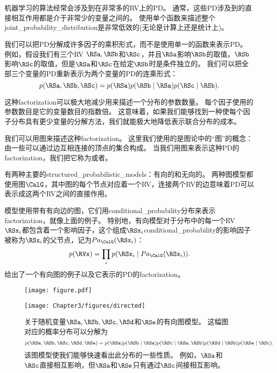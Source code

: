 
\section{}
\label{sec:structured_probabilistic_models_chap3}

机器学习的算法经常会涉及到在非常多的\gls{RV}上的\gls{PD}。
通常，这些\gls{PD}涉及到的直接相互作用都是介于非常少的变量之间的。
使用单个函数来描述整个\gls{joint_probability_distribution}是非常低效的(无论是计算上还是统计上)。

我们可以把\gls{PD}分解成许多因子的乘积形式，而不是使用单一的函数来表示\gls{PD}。
例如，假设我们有三个\gls{RV} $\RSa, \RSb$和$\RSc$，并且$\RSa$影响$\RSb$的取值，$\RSb$影响$\RSc$的取值，但是$\RSa$和$\RSc$在给定$\RSb$时是条件独立的。
我们可以把全部三个变量的\gls{PD}重新表示为两个变量的\gls{PD}的连乘形式：
\begin{equation}
p(\RSa, \RSb, \RSc) = p(\RSa)p(\RSb\mid \RSa)p(\RSc\mid\RSb).
\end{equation}

这种\gls{factorization}可以极大地减少用来描述一个分布的参数数量。
每个因子使用的参数数目是它的变量数目的指数倍。
这意味着，如果我们能够找到一种使每个因子分布具有更少变量的分解方法，我们就能极大地降低表示联合分布的成本。

我们可以用图来描述这种\gls{factorization}。
这里我们使用的是图论中的``图''的概念：由一些可以通过边互相连接的顶点的集合构成。
当我们用图来表示这种\gls{PD}的\gls{factorization}，我们把它称为或者。

有两种主要的\gls{structured_probabilistic_models}：有向的和无向的。
两种图模型都使用图$\CalG$，其中图的每个节点对应着一个\gls{RV}，连接两个\gls{RV}的边意味着\gls{PD}可以表示成这两个\gls{RV}之间的直接作用。

模型使用带有有向边的图，它们用\gls{conditional_probability}分布来表示\gls{factorization}，就像上面的例子。
特别地，有向模型对于分布中的每一个\gls{RV} $\RSx_i$都包含着一个影响因子，这个组成$\RSx_i$\gls{conditional_probability}的影响因子被称为$\RSx_i$的父节点，记为$Pa_\CalG(\RSx_i)$：
\begin{equation}
p(\RVx) = \prod_i p(\RSx_i \mid Pa_\CalG(\RSx_i)).
\end{equation}
给出了一个有向图的例子以及它表示的\gls{PD}的\gls{factorization}。
\begin{figure}[!htb]
\ifOpenSource
\centerline{\texttt{[image: figure.pdf]}}
\else
\centerline{\texttt{[image: Chapter3/figures/directed]}}
\fi
\captionsetup{singlelinecheck=off}
\caption[.]{关于随机变量$\RSa, \RSb, \RSc, \RSd$和$\RSe$的有向图模型。
这幅图对应的概率分布可以分解为
\begin{equation}
p(\RSa, \RSb, \RSc, \RSd, \RSe) = p(\RSa) p(\RSb \mid \RSa) p(\RSc \mid \RSa, \RSb) p(\RSd \mid \RSb) p(\RSe \mid \RSc).
\end{equation}
该图模型使我们能够快速看出此分布的一些性质。
例如，$\RSa$和$\RSc$直接相互影响，但$\RSa$和$\RSe$只有通过$\RSc$间接相互影响。}
\label{fig:chap3_directed}
\end{figure}



